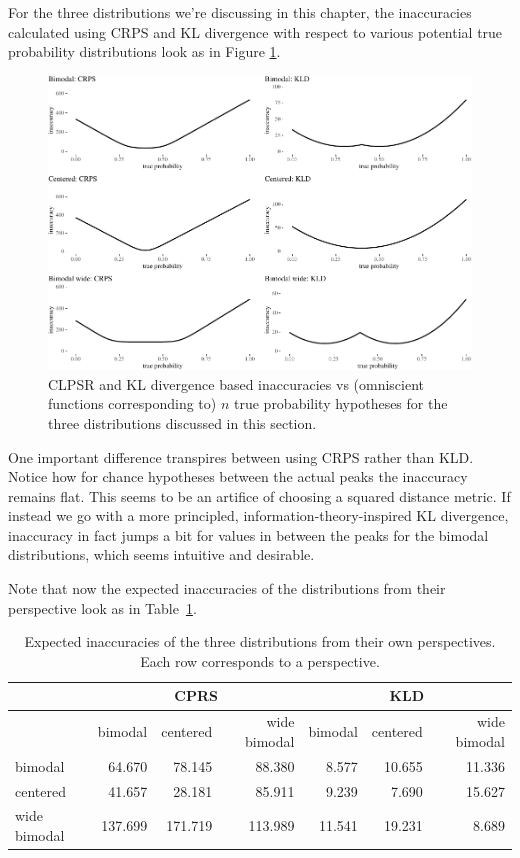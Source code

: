 \documentclass[
  10pt,
  dvipsnames,enabledeprecatedfontcommands]{scrartcl}
\begin{document}
For the three distributions we're discussing in this chapter, the
inaccuracies calculated using CRPS and KL divergence with respect to
various potential true probability distributions look as in Figure
\ref{fig:inaccuracies2}.

\begin{figure}[H]

\begin{center}\includegraphics[width=1\linewidth]{impreciseEpistemicFINAL_files/figure-latex/fig:inaccuracies2-1} \end{center}
\caption{CLPSR and KL divergence based inaccuracies vs (omniscient functions corresponding to) $n$ true probability hypotheses for the three distributions discussed in this section.}
\label{fig:inaccuracies2}
\end{figure}

One important difference transpires between using CRPS rather than KLD.
Notice how for chance hypotheses between the actual peaks the inaccuracy
remains flat. This seems to be an artifice of choosing a squared
distance metric. If instead we go with a more principled,
information-theory-inspired KL divergence, inaccuracy in fact jumps a
bit for values in between the peaks for the bimodal distributions, which
seems intuitive and desirable.

Note that now the expected inaccuracies of the distributions from their
perspective look as in \mbox{Table \ref{tab:expected2}.}

\begin{table}[H]
\begin{tabular}{lrrrrrr}
& \multicolumn{3}{c}{CPRS} & \multicolumn{3}{c}{KLD} \\
\toprule
  & bimodal & centered & wide bimodal & bimodal & centered & wide bimodal\\
\midrule
bimodal & 64.670 & 78.145 & 88.380 & 8.577 & 10.655 & 11.336\\
centered & 41.657 & 28.181 & 85.911 & 9.239 & 7.690 & 15.627\\
wide bimodal & 137.699 & 171.719 & 113.989 & 11.541 & 19.231 & 8.689\\
\bottomrule
\end{tabular}
\caption{Expected inaccuracies of the three distributions from their own perspectives. Each row corresponds to a perspective.}
\label{tab:expected2}
\end{table}
\end{document}
